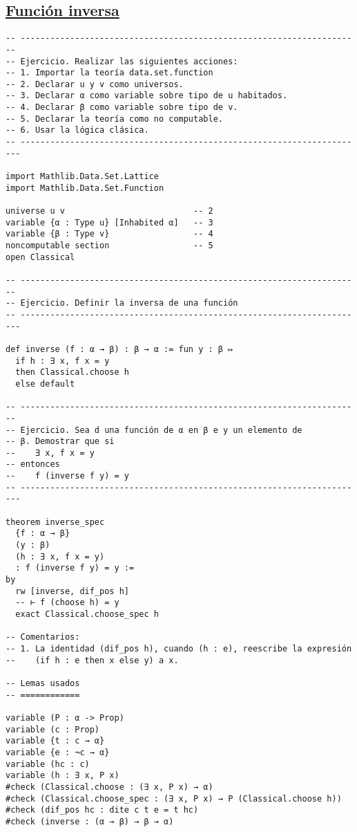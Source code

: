 \subsection{\href{./src/Conjuntos/Funcion\_inversa.lean}{Función inversa}}
\label{sec:orgb7c382b}
\begin{verbatim}
-- ---------------------------------------------------------------------
-- Ejercicio. Realizar las siguientes acciones:
-- 1. Importar la teoría data.set.function
-- 2. Declarar u y v como universos.
-- 3. Declarar α como variable sobre tipo de u habitados.
-- 4. Declarar β como variable sobre tipo de v.
-- 5. Declarar la teoría como no computable.
-- 6. Usar la lógica clásica.
-- ----------------------------------------------------------------------

import Mathlib.Data.Set.Lattice
import Mathlib.Data.Set.Function

universe u v                          -- 2
variable {α : Type u} [Inhabited α]   -- 3
variable {β : Type v}                 -- 4
noncomputable section                 -- 5
open Classical

-- ---------------------------------------------------------------------
-- Ejercicio. Definir la inversa de una función
-- ----------------------------------------------------------------------

def inverse (f : α → β) : β → α := fun y : β ↦
  if h : ∃ x, f x = y
  then Classical.choose h
  else default

-- ---------------------------------------------------------------------
-- Ejercicio. Sea d una función de α en β e y un elemento de
-- β. Demostrar que si
--    ∃ x, f x = y
-- entonces
--    f (inverse f y) = y
-- ----------------------------------------------------------------------

theorem inverse_spec
  {f : α → β}
  (y : β)
  (h : ∃ x, f x = y)
  : f (inverse f y) = y :=
by
  rw [inverse, dif_pos h]
  -- ⊢ f (choose h) = y
  exact Classical.choose_spec h

-- Comentarios:
-- 1. La identidad (dif_pos h), cuando (h : e), reescribe la expresión
--    (if h : e then x else y) a x.

-- Lemas usados
-- ============

variable (P : α -> Prop)
variable (c : Prop)
variable {t : c → α}
variable {e : ¬c → α}
variable (hc : c)
variable (h : ∃ x, P x)
#check (Classical.choose : (∃ x, P x) → α)
#check (Classical.choose_spec : (∃ x, P x) → P (Classical.choose h))
#check (dif_pos hc : dite c t e = t hc)
#check (inverse : (α → β) → β → α)
\end{verbatim}

